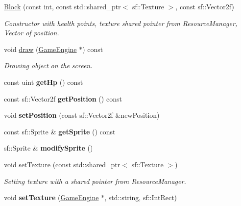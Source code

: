 \begin{DoxyCompactItemize}
\item 
\mbox{\label{class_block_a6e2109c914d77166f2879944da582e7a}} 
\mbox{\hyperlink{class_block_a6e2109c914d77166f2879944da582e7a}{Block}} (const int, const std\+::shared\+\_\+ptr$<$ sf\+::\+Texture $>$, const sf\+::\+Vector2f)
\begin{DoxyCompactList}\small\item\em Constructor with health points, texture shared pointer from Resource\+Manager, Vector of position. \end{DoxyCompactList}\item 
\mbox{\label{class_block_a3a41cfe615a31b5c4b824004d248ba65}} 
void \mbox{\hyperlink{class_block_a3a41cfe615a31b5c4b824004d248ba65}{draw}} (\mbox{\hyperlink{class_game_engine}{Game\+Engine}} $\ast$) const
\begin{DoxyCompactList}\small\item\em Drawing object on the screen. \end{DoxyCompactList}\item 
\mbox{\label{class_block_a01788216d95ab7230287cb0d58a19c34}} 
const uint {\bfseries get\+Hp} () const
\item 
\mbox{\label{class_block_ae7621aaed284804fc898174207eb1587}} 
const sf\+::\+Vector2f {\bfseries get\+Position} () const
\item 
\mbox{\label{class_block_a9c4782f321b4760d572a01bd31c42a06}} 
void {\bfseries set\+Position} (const sf\+::\+Vector2f \&new\+Position)
\item 
\mbox{\label{class_block_a40e27a756a586c9784d4023163bf92ef}} 
const sf\+::\+Sprite \& {\bfseries get\+Sprite} () const
\item 
\mbox{\label{class_block_affece2c491813eba0583a9deeee9d925}} 
sf\+::\+Sprite \& {\bfseries modify\+Sprite} ()
\item 
\mbox{\label{class_block_a01ef735022e9a92357e00cca6228f7b7}} 
void \mbox{\hyperlink{class_block_a01ef735022e9a92357e00cca6228f7b7}{set\+Texture}} (const std\+::shared\+\_\+ptr$<$ sf\+::\+Texture $>$)
\begin{DoxyCompactList}\small\item\em Setting texture with a shared pointer from Resource\+Manager. \end{DoxyCompactList}\item 
\mbox{\label{class_block_a866e57c9df2c81910879ef991670931e}} 
void {\bfseries set\+Texture} (\mbox{\hyperlink{class_game_engine}{Game\+Engine}} $\ast$, std\+::string, sf\+::\+Int\+Rect)
\end{DoxyCompactItemize}
